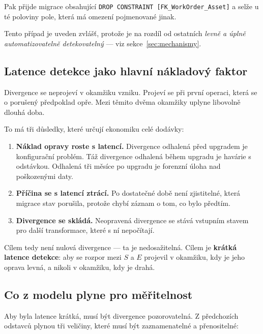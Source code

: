 \documentclass[11pt,a4paper]{article}
\begin{document}
Pak přijde migrace obsahující
\texttt{DROP CONSTRAINT [FK\_WorkOrder\_Asset]} a selže u té poloviny pole,
která má omezení pojmenované jinak.

Tento případ je uveden zvlášť, protože je na rozdíl od ostatních
\emph{levně a úplně automatizovatelně detekovatelný} --- viz
sekce~\ref{sec:mechanismy}.

\subsection{Latence detekce jako hlavní nákladový faktor}

Divergence se neprojeví v okamžiku vzniku. Projeví se při první operaci,
která se o porušený předpoklad opře. Mezi těmito dvěma okamžiky uplyne
libovolně dlouhá doba.

To má tři důsledky, které určují ekonomiku celé dodávky:

\begin{enumerate}[leftmargin=1.6em]
\item \textbf{Náklad opravy roste s latencí.} Divergence odhalená před
      upgradem je konfigurační problém. Táž divergence odhalená během
      upgradu je havárie s odstávkou. Odhalená tři měsíce po upgradu je
      forenzní úloha nad poškozenými daty.
\item \textbf{Příčina se s latencí ztrácí.} Po dostatečné době není
      zjistitelné, která migrace stav porušila, protože chybí záznam
      o tom, co bylo předtím.
\item \textbf{Divergence se skládá.} Neopravená divergence se stává
      vstupním stavem pro další transformace, které s ní nepočítají.
\end{enumerate}

Cílem tedy není nulová divergence --- ta je nedosažitelná. Cílem je
\textbf{krátká latence detekce}: aby se rozpor mezi $S$ a $E$ projevil
v okamžiku, kdy je jeho oprava levná, a nikoli v okamžiku, kdy je drahá.

\subsection{Co z modelu plyne pro měřitelnost}

Aby byla latence krátká, musí být divergence pozorovatelná. Z předchozích
odstavců plynou tři veličiny, které musí být zaznamenatelné a přenositelné:
\end{document}
